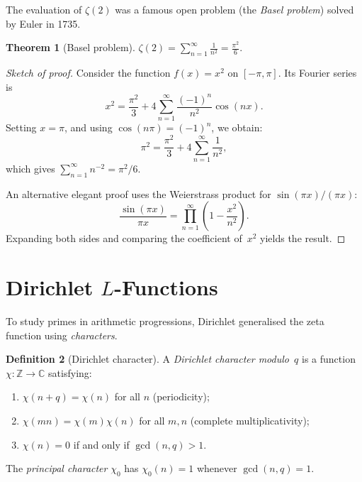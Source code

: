 \documentclass[12pt,a4paper,openany]{book}
\theoremstyle{definition}
\newtheorem{definition}{Definition}[chapter]
\theoremstyle{plain}
\newtheorem{theorem}[definition]{Theorem}
\theoremstyle{remark}
\newcommand{\Z}{\mathbb{Z}}
\newcommand{\C}{\mathbb{C}}
\begin{document}
The evaluation of $\zeta(2)$ was a famous open problem (the \emph{Basel
problem}) solved by Euler in 1735.

\begin{theorem}[Basel problem]
\label{thm:zeta-2}
$\displaystyle\zeta(2) = \sum_{n=1}^{\infty} \frac{1}{n^2} = \frac{\pi^2}{6}.$
\end{theorem}

\begin{proof}[Sketch of proof]
Consider the function $f(x) = x^2$ on $[-\pi, \pi]$. Its Fourier
series is
\[
  x^2 = \frac{\pi^2}{3} + 4\sum_{n=1}^{\infty} \frac{(-1)^n}{n^2}\cos(nx).
\]
Setting $x = \pi$, and using $\cos(n\pi) = (-1)^n$, we obtain:
\[
  \pi^2 = \frac{\pi^2}{3} + 4\sum_{n=1}^{\infty} \frac{1}{n^2},
\]
which gives $\sum_{n=1}^{\infty} n^{-2} = \pi^2/6$.

An alternative elegant proof uses the Weierstrass product for
$\sin(\pi x)/(\pi x)$:
\[
  \frac{\sin(\pi x)}{\pi x} = \prod_{n=1}^{\infty}\left(1 - \frac{x^2}{n^2}\right).
\]
Expanding both sides and comparing the coefficient of~$x^2$ yields the result.
\end{proof}

\section{Dirichlet \texorpdfstring{$L$}{L}-Functions}
\label{sec:dirichlet-L}

To study primes in arithmetic progressions, Dirichlet generalised the zeta
function using \emph{characters}.

\begin{definition}[Dirichlet character]
\label{def:dirichlet-character}
A \emph{Dirichlet character modulo~$q$} is a function $\chi\colon \Z \to \C$
satisfying:
\begin{enumerate}
  \item $\chi(n+q) = \chi(n)$ for all $n$ (periodicity);
  \item $\chi(mn) = \chi(m)\chi(n)$ for all $m,n$ (complete multiplicativity);
  \item $\chi(n) = 0$ if and only if $\gcd(n,q) > 1$.
\end{enumerate}
The \emph{principal character} $\chi_0$ has
$\chi_0(n)=1$ whenever $\gcd(n,q)=1$.
\end{definition}
\end{document}
